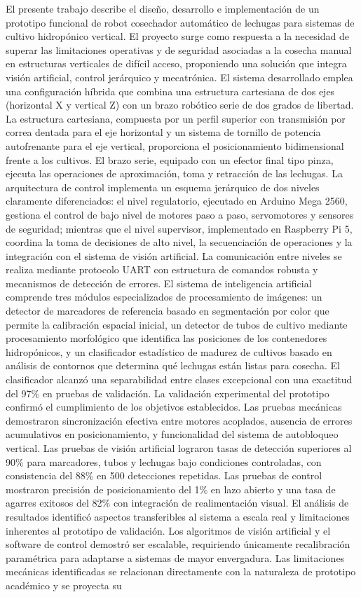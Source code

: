 El presente trabajo describe el diseño, desarrollo e implementación de un prototipo funcional de robot cosechador automático de lechugas para sistemas de cultivo hidropónico vertical. El proyecto surge como respuesta a la necesidad de superar las limitaciones operativas y de seguridad asociadas a la cosecha manual en estructuras verticales de difícil acceso, proponiendo una solución que integra visión artificial, control jerárquico y mecatrónica. El sistema desarrollado emplea una configuración híbrida que combina una estructura cartesiana de dos ejes (horizontal X y vertical Z) con un brazo robótico serie de dos grados de libertad. La estructura cartesiana, compuesta por un perfil superior con transmisión por correa dentada para el eje horizontal y un sistema de tornillo de potencia autofrenante para el eje vertical, proporciona el posicionamiento bidimensional frente a los cultivos. El brazo serie, equipado con un efector final tipo pinza, ejecuta las operaciones de aproximación, toma y retracción de las lechugas. La arquitectura de control implementa un esquema jerárquico de dos niveles claramente diferenciados: el nivel regulatorio, ejecutado en Arduino Mega 2560, gestiona el control de bajo nivel de motores paso a paso, servomotores y sensores de seguridad; mientras que el nivel supervisor, implementado en Raspberry Pi 5, coordina la toma de decisiones de alto nivel, la secuenciación de operaciones y la integración con el sistema de visión artificial. La comunicación entre niveles se realiza mediante protocolo UART con estructura de comandos robusta y mecanismos de detección de errores. El sistema de inteligencia artificial comprende tres módulos especializados de procesamiento de imágenes: un detector de marcadores de referencia basado en segmentación por color que permite la calibración espacial inicial, un detector de tubos de cultivo mediante procesamiento morfológico que identifica las posiciones de los contenedores hidropónicos, y un clasificador estadístico de madurez de cultivos basado en análisis de contornos que determina qué lechugas están listas para cosecha. El clasificador alcanzó una separabilidad entre clases excepcional con una exactitud del 97\% en pruebas de validación. La validación experimental del prototipo confirmó el cumplimiento de los objetivos establecidos. Las pruebas mecánicas demostraron sincronización efectiva entre motores acoplados, ausencia de errores acumulativos en posicionamiento, y funcionalidad del sistema de autobloqueo vertical. Las pruebas de visión artificial lograron tasas de detección superiores al 90\% para marcadores, tubos y lechugas bajo condiciones controladas, con consistencia del 88\% en 500 detecciones repetidas. Las pruebas de control mostraron precisión de posicionamiento del 1\% en lazo abierto y una tasa de agarres exitosos del 82\% con integración de realimentación visual. El análisis de resultados identificó aspectos transferibles al sistema a escala real y limitaciones inherentes al prototipo de validación. Los algoritmos de visión artificial y el software de control demostró ser escalable, requiriendo únicamente recalibración paramétrica para adaptarse a sistemas de mayor envergadura. Las limitaciones mecánicas identificadas se relacionan directamente con la naturaleza de prototipo académico y se proyecta su 